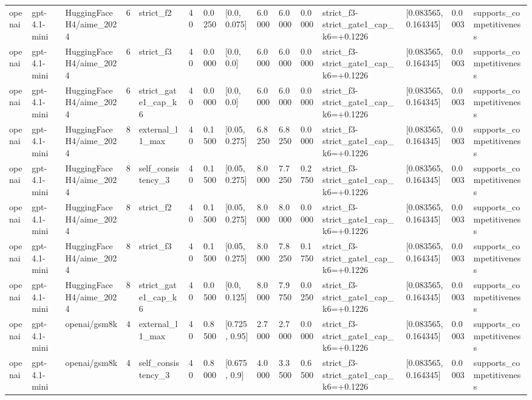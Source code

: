 \begin{tabular}{lllllllllllllll}
openai & gpt-4.1-mini & HuggingFaceH4/aime\_2024 & 6 & strict\_f2 & 40 & 0.0250 & [0.0, 0.075] & 6.0000 & 6.0000 & 0.0000 & strict\_f3-strict\_gate1\_cap\_k6=+0.1226 & [0.083565, 0.164345] & 0.0003 & supports\_competitiveness \\
openai & gpt-4.1-mini & HuggingFaceH4/aime\_2024 & 6 & strict\_f3 & 40 & 0.0000 & [0.0, 0.0] & 6.0000 & 6.0000 & 0.0000 & strict\_f3-strict\_gate1\_cap\_k6=+0.1226 & [0.083565, 0.164345] & 0.0003 & supports\_competitiveness \\
openai & gpt-4.1-mini & HuggingFaceH4/aime\_2024 & 6 & strict\_gate1\_cap\_k6 & 40 & 0.0000 & [0.0, 0.0] & 6.0000 & 6.0000 & 0.0000 & strict\_f3-strict\_gate1\_cap\_k6=+0.1226 & [0.083565, 0.164345] & 0.0003 & supports\_competitiveness \\
openai & gpt-4.1-mini & HuggingFaceH4/aime\_2024 & 8 & external\_l1\_max & 40 & 0.1500 & [0.05, 0.275] & 6.8250 & 6.8250 & 0.0000 & strict\_f3-strict\_gate1\_cap\_k6=+0.1226 & [0.083565, 0.164345] & 0.0003 & supports\_competitiveness \\
openai & gpt-4.1-mini & HuggingFaceH4/aime\_2024 & 8 & self\_consistency\_3 & 40 & 0.1500 & [0.05, 0.275] & 8.0000 & 7.7250 & 0.2750 & strict\_f3-strict\_gate1\_cap\_k6=+0.1226 & [0.083565, 0.164345] & 0.0003 & supports\_competitiveness \\
openai & gpt-4.1-mini & HuggingFaceH4/aime\_2024 & 8 & strict\_f2 & 40 & 0.1500 & [0.05, 0.275] & 8.0000 & 8.0000 & 0.0000 & strict\_f3-strict\_gate1\_cap\_k6=+0.1226 & [0.083565, 0.164345] & 0.0003 & supports\_competitiveness \\
openai & gpt-4.1-mini & HuggingFaceH4/aime\_2024 & 8 & strict\_f3 & 40 & 0.1500 & [0.05, 0.275] & 8.0000 & 7.8250 & 0.1750 & strict\_f3-strict\_gate1\_cap\_k6=+0.1226 & [0.083565, 0.164345] & 0.0003 & supports\_competitiveness \\
openai & gpt-4.1-mini & HuggingFaceH4/aime\_2024 & 8 & strict\_gate1\_cap\_k6 & 40 & 0.0500 & [0.0, 0.125] & 8.0000 & 7.9750 & 0.0250 & strict\_f3-strict\_gate1\_cap\_k6=+0.1226 & [0.083565, 0.164345] & 0.0003 & supports\_competitiveness \\
openai & gpt-4.1-mini & openai/gsm8k & 4 & external\_l1\_max & 40 & 0.8500 & [0.725, 0.95] & 2.7000 & 2.7000 & 0.0000 & strict\_f3-strict\_gate1\_cap\_k6=+0.1226 & [0.083565, 0.164345] & 0.0003 & supports\_competitiveness \\
openai & gpt-4.1-mini & openai/gsm8k & 4 & self\_consistency\_3 & 40 & 0.8000 & [0.675, 0.9] & 4.0000 & 3.3500 & 0.6500 & strict\_f3-strict\_gate1\_cap\_k6=+0.1226 & [0.083565, 0.164345] & 0.0003 & supports\_competitiveness \\

\end{tabular}
